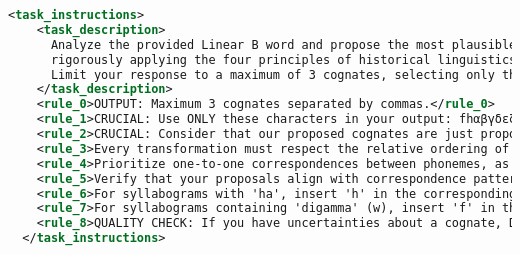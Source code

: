 \begin{lstlisting}[style=mystyle, language=XML, breaklines=true]
  <task_instructions>
    <task_description>
      Analyze the provided Linear B word and propose the most plausible Ancient Greek cognates,
      rigorously applying the four principles of historical linguistics listed above. 
      Limit your response to a maximum of 3 cognates, selecting only those with the highest linguistic probability.
    </task_description>
    <rule_0>OUTPUT: Maximum 3 cognates separated by commas.</rule_0>
    <rule_1>CRUCIAL: Use ONLY these characters in your output: fhαβγδεζηθικλμνξοπρςστυφχψω. do NOT use ANY OTHER LATIN CHARACTER, ACCENTS, SUBSCRIPT IOTA, SPIRITS.</rule_1>
    <rule_2>CRUCIAL: Consider that our proposed cognates are just proposals of words with similar root in the Homeric scripts. DO NOT RELY ON THEM FOR FINDING THE COGNATES, FIND THEM YOURSELF FROM THE ENTIRE ANCIENT GREEK CORPUS!!!For each proposed correspondence, verify that it is consistent with Principle 1 (Distributional Similarity)</rule_2>
    <rule_3>Every transformation must respect the relative ordering of phonemes, as required by Principle 2 (Monotonic Mapping)</rule_3>
    <rule_4>Prioritize one-to-one correspondences between phonemes, as indicated by Principle 3 (Structural Sparsity)</rule_4>
    <rule_5>Verify that your proposals align with correspondence patterns already documented between Linear B and ancient Greek (Principle 4)</rule_5>
    <rule_6>For syllabograms with 'ha', insert 'h' in the corresponding position in the Ancient Greek sequence</rule_6>
    <rule_7>For syllabograms containing 'digamma' (w), insert 'f' in the corresponding position</rule_7>
    <rule_8>QUALITY CHECK: If you have uncertainties about a cognate, DO NOT include it in the output</rule_8>
  </task_instructions>


\end{lstlisting}
